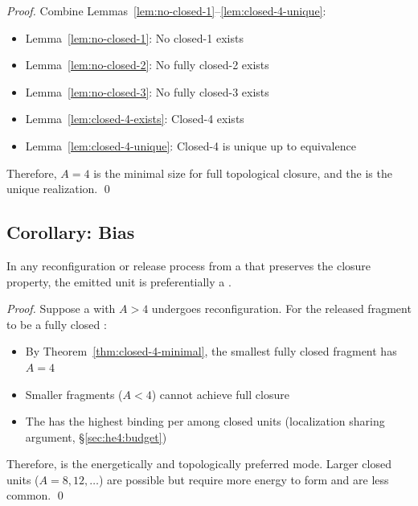 \begin{proof}
    Combine Lemmas~\ref{lem:no-closed-1}--\ref{lem:closed-4-unique}:
    \begin{itemize}
        \item Lemma~\ref{lem:no-closed-1}: No closed-1 exists
        \item Lemma~\ref{lem:no-closed-2}: No fully closed-2 exists
        \item Lemma~\ref{lem:no-closed-3}: No fully closed-3 exists
        \item Lemma~\ref{lem:closed-4-exists}: Closed-4 exists
        \item Lemma~\ref{lem:closed-4-unique}: Closed-4 is unique up to equivalence
    \end{itemize}
    Therefore, $A = 4$ is the minimal size for full topological closure,
    and the \ClosedFour{} is the unique realization. \qed
\end{proof}

\subsection{Corollary: \ClosedFourRelease{} Bias}
\label{sec:he4:min:corollary}

\begin{corollary} \tagDer
    \label{cor:release-bias}
    In any reconfiguration or release process from a \HighCoordCluster{} that
    preserves the closure property, the emitted unit is preferentially
    a \ClosedFour{}.
\end{corollary}

\begin{proof}
    Suppose a \HighCoordCluster{} with $A > 4$ undergoes reconfiguration.
    For the released fragment to be a fully closed \ClusterState{}:
    \begin{itemize}
        \item By Theorem~\ref{thm:closed-4-minimal}, the smallest fully closed
              fragment has $A = 4$
        \item Smaller fragments ($A < 4$) cannot achieve full closure
        \item The \ClosedFour{} has the highest binding per \Constituent{}
              among closed units (localization sharing argument, \S\ref{sec:he4:budget})
    \end{itemize}

    Therefore, \ClosedFourRelease{} is the energetically and topologically
    preferred mode. Larger closed units ($A = 8, 12, \ldots$) are possible
    but require more energy to form and are less common. \qed
\end{proof}

